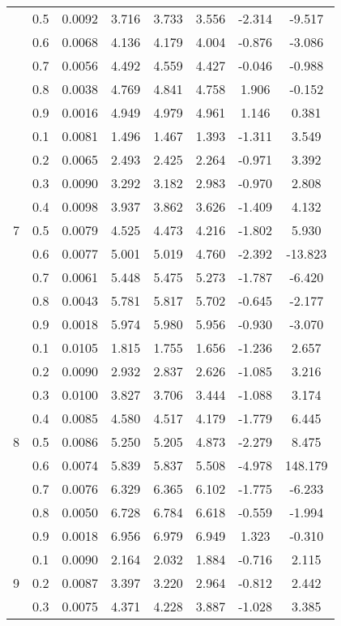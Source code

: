 \documentclass[11pt,a4paper]{report}
\begin{document}
\begin{longtable}{ | c | c || c | c | c | c | c | c | }
 & 0.5 & 0.0092 & 3.716 & 3.733 & 3.556 & -2.314 & -9.517 \\
 & 0.6 & 0.0068 & 4.136 & 4.179 & 4.004 & -0.876 & -3.086 \\
 & 0.7 & 0.0056 & 4.492 & 4.559 & 4.427 & -0.046 & -0.988 \\
 & 0.8 & 0.0038 & 4.769 & 4.841 & 4.758 & 1.906 & -0.152 \\
 & 0.9 & 0.0016 & 4.949 & 4.979 & 4.961 & 1.146 & 0.381 \\
 \hline
\multirow{9}{*}{7} & 0.1 & 0.0081 & 1.496 & 1.467 & 1.393 & -1.311 & 3.549 \\
 & 0.2 & 0.0065 & 2.493 & 2.425 & 2.264 & -0.971 & 3.392 \\
 & 0.3 & 0.0090 & 3.292 & 3.182 & 2.983 & -0.970 & 2.808 \\
 & 0.4 & 0.0098 & 3.937 & 3.862 & 3.626 & -1.409 & 4.132 \\
 & 0.5 & 0.0079 & 4.525 & 4.473 & 4.216 & -1.802 & 5.930 \\
 & 0.6 & 0.0077 & 5.001 & 5.019 & 4.760 & -2.392 & -13.823 \\
 & 0.7 & 0.0061 & 5.448 & 5.475 & 5.273 & -1.787 & -6.420 \\
 & 0.8 & 0.0043 & 5.781 & 5.817 & 5.702 & -0.645 & -2.177 \\
 & 0.9 & 0.0018 & 5.974 & 5.980 & 5.956 & -0.930 & -3.070 \\
 \hline
\multirow{9}{*}{8} & 0.1 & 0.0105 & 1.815 & 1.755 & 1.656 & -1.236 & 2.657 \\
 & 0.2 & 0.0090 & 2.932 & 2.837 & 2.626 & -1.085 & 3.216 \\
 & 0.3 & 0.0100 & 3.827 & 3.706 & 3.444 & -1.088 & 3.174 \\
 & 0.4 & 0.0085 & 4.580 & 4.517 & 4.179 & -1.779 & 6.445 \\
 & 0.5 & 0.0086 & 5.250 & 5.205 & 4.873 & -2.279 & 8.475 \\
 & 0.6 & 0.0074 & 5.839 & 5.837 & 5.508 & -4.978 & 148.179 \\
 & 0.7 & 0.0076 & 6.329 & 6.365 & 6.102 & -1.775 & -6.233 \\
 & 0.8 & 0.0050 & 6.728 & 6.784 & 6.618 & -0.559 & -1.994 \\
 & 0.9 & 0.0018 & 6.956 & 6.979 & 6.949 & 1.323 & -0.310 \\
 \hline
\multirow{9}{*}{9} & 0.1 & 0.0090 & 2.164 & 2.032 & 1.884 & -0.716 & 2.115 \\
 & 0.2 & 0.0087 & 3.397 & 3.220 & 2.964 & -0.812 & 2.442 \\
 & 0.3 & 0.0075 & 4.371 & 4.228 & 3.887 & -1.028 & 3.385 \\

\end{longtable}
\end{document}

